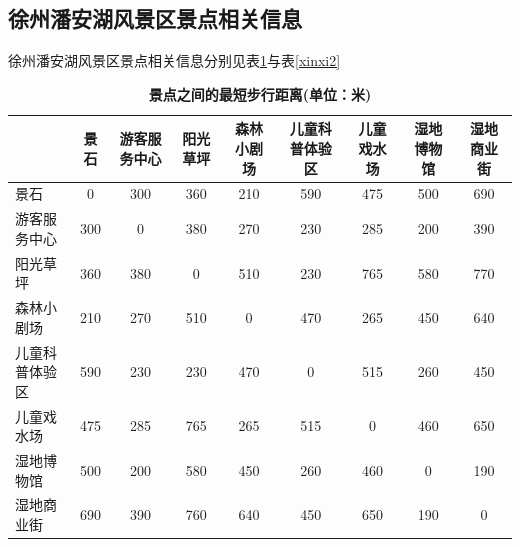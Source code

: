 \documentclass[hyperref,UTF8]{article}
\begin{document}
\subsection{徐州潘安湖风景区景点相关信息}
徐州潘安湖风景区景点相关信息分别见表\ref{xinxi1}与表\ref{xinxi2}
\begin{table}[htbp]
  \centering
  \caption{\textbf{景点之间的最短步行距离(单位：米)}}\label{xinxi1}%
    \begin{tabular}{|p{4.555em}|c|c|c|c|c|c|c|c|}
    \hline
    \multicolumn{1}{|p{3.055em}|}{} & \multicolumn{1}{p{3.055em}|}{景石} & \multicolumn{1}{p{3.055em}|}{游客服务中心} & \multicolumn{1}{p{3.055em}|}{阳光草坪} & \multicolumn{1}{p{3.055em}|}{森林小剧场} & \multicolumn{1}{p{3.055em}|}{儿童科普体验区} & \multicolumn{1}{p{3.055em}|}{儿童戏水场} & \multicolumn{1}{p{3.055em}|}{湿地博物馆} & \multicolumn{1}{p{4.055em}|}{湿地商业街} \bigstrut\\
    \hline
    景石    & 0     & 300   & 360   & 210   & 590   & 475   & 500   & 690 \bigstrut\\
    \hline
    游客服务中心 & 300   & 0     & 380   & 270   & 230   & 285   & 200   & 390 \bigstrut\\
    \hline
    阳光草坪  & 360   & 380   & 0     & 510   & 230   & 765   & 580   & 770 \bigstrut\\
    \hline
    森林小剧场 & 210   & 270   & 510   & 0     & 470   & 265   & 450   & 640 \bigstrut\\
    \hline
    儿童科普体验区 & 590   & 230   & 230   & 470   & 0     & 515   & 260   & 450 \bigstrut\\
    \hline
    儿童戏水场 & 475   & 285   & 765   & 265   & 515   & 0     & 460   & 650 \bigstrut\\
    \hline
    湿地博物馆 & 500   & 200   & 580   & 450   & 260   & 460   & 0     & 190 \bigstrut\\
    \hline
    湿地商业街 & 690   & 390   & 760   & 640   & 450   & 650   & 190   & 0 \bigstrut\\
    \hline
    \end{tabular}%

\end{table}%
\end{document}
